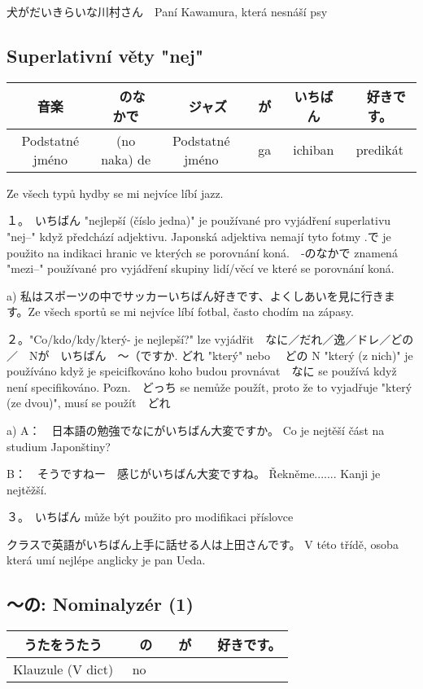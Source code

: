 犬がだいきらいな川村さん　Paní Kawamura, která nesnáší psy

\subsection{Superlativní věty "nej"}
\begin{tabular}{||c|c||c|c||c||c||}
\hline
音楽&　のなかで&　ジャズ　&が　&いちばん&　好きです。\\
\hline
Podstatné jméno&(no naka) de& Podstatné jméno& ga& ichiban&predikát\\
\hline
\end{tabular}
Ze všech typů hydby se mi nejvíce líbí jazz.

１。　いちばん "nejlepší (číslo jedna)" je používané pro vyjádření superlativu "nej--" když předchází adjektivu. Japonská adjektiva nemají tyto fotmy .で je použito na indikaci hranic ve kterých se porovnání koná.　-のなかで znamená "mezi--" používané pro vyjádření skupiny lidí/věcí ve které se porovnání koná.

a) 私はスポーツの中でサッカーいちばん好きです、よくしあいを見に行きます。Ze všech sportů se mi nejvíce líbí fotbal, často chodím na zápasy.

２。"Co/kdo/kdy/který- je nejlepší?" lze vyjádřit　なに／だれ／逸／ドレ／どの／　Nが　いちばん　〜（ですか. どれ "který" nebo 　どの N "který (z nich)" je používáno když je speicifkováno koho budou provnávat　なに se používá když není specifikováno. Pozn.　どっち se nemůže použít, proto že to vyjadřuje "který (ze dvou)", musí se použít　どれ

a)
 A：　日本語の勉強でなにがいちばん大変ですか。  Co je nejtěší část na studium Japonštiny?
 
B：　そうですねー　感じがいちばん大変ですね。 Řekněme....... Kanji je nejtěžší.


３。　いちばん může být použito pro modifikaci příslovce

クラスで英語がいちばん上手に話せる人は上田さんです。 V této třídě, osoba která umí nejlépe anglicky je pan Ueda.

\subsection*{〜の: Nominalyzér (1)}

\begin{tabular}{||c|c|c||c||}
\hline
うたをうたう&　の&　が&　好きです。\\
\hline
Klauzule (V dict)&no&&\\
\hline
\end{tabular}

